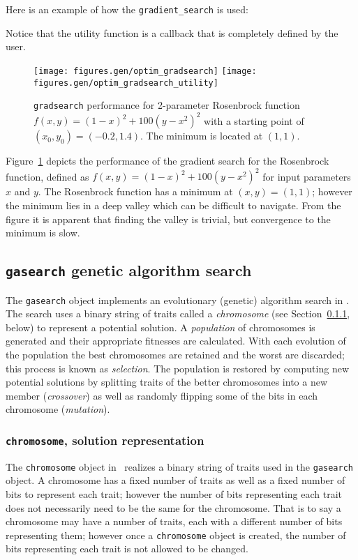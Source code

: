 %
Here is an example of how the {\tt gradient\_search} is used:
% 

%
Notice that the utility function is a callback that is completely
defined by the user.
%
\begin{figure}
\centering
  \texttt{[image: figures.gen/optim\_gradsearch]}
  \texttt{[image: figures.gen/optim\_gradsearch\_utility]}
\caption{
    {\tt gradsearch} performance for 2-parameter Rosenbrock function
    $f(x,y) = (1-x)^2 + 100(y-x^2)^2$
    with a starting point of $(x_0,y_0)=(-0.2,1.4)$.
    The minimum is located at $(1,1)$.}
\label{fig:module:optim:gradsearch}
\end{figure}
%
Figure~\ref{fig:module:optim:gradsearch} depicts the performance of the
gradient search for the Rosenbrock function, defined as
$f(x,y) = (1-x)^2 + 100(y-x^2)^2$ for input parameters $x$ and $y$.
The Rosenbrock function has a minimum at $(x,y)=(1,1)$;
however the minimum lies in a deep valley which can be difficult to
navigate.
From the figure it is apparent that finding the valley is trivial,
but convergence to the minimum is slow.


\subsection{{\tt gasearch} genetic algorithm search}
\label{module:optim:gasearch}

The {\tt gasearch} object implements an evolutionary (genetic)
algorithm search in \liquid.
The search uses a binary string of traits called a {\em chromosome}
(see Section~\ref{module:optim:gasearch:chromosome}, below)
to represent a potential solution.
A {\em population} of chromosomes is generated and their appropriate
fitnesses are calculated.
With each evolution of the population the best chromosomes are retained
and the worst are discarded; this process is known as {\em selection}.
The population is restored by computing new potential solutions by
splitting traits of the better chromosomes into a new member
({\em crossover}) as well as randomly flipping some of the bits in each
chromosome ({\em mutation}).

\subsubsection{{\tt chromosome}, solution representation}
\label{module:optim:gasearch:chromosome}
The {\tt chromosome} object in \liquid\ realizes a binary string of
traits used in the {\tt gasearch} object.
A chromosome has a fixed number of traits as well as a fixed number of
bits to represent each trait;
however the number of bits representing each trait does not necessarily
need to be the same for the chromosome.
That is to say a chromosome may have a number of traits, each with a
different number of bits representing them;
however once a {\tt chromosome} object is created, the number of bits
representing each trait is not allowed to be changed.

